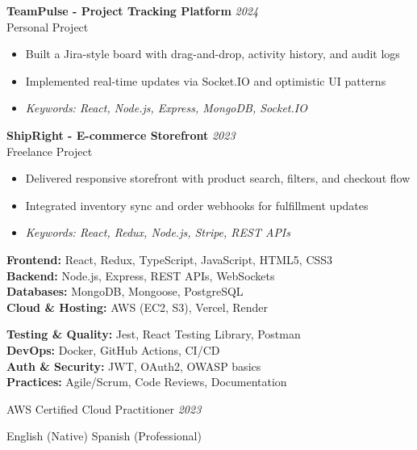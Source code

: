 \documentclass[11pt,a4paper]{article}
\begin{document}

\textbf{TeamPulse - Project Tracking Platform} \hfill \textit{2024}\\[-2pt]
Personal Project\\[-5pt]
\begin{itemize}[leftmargin=8pt,itemsep=1pt,topsep=2pt]
  \item Built a Jira-style board with drag-and-drop, activity history, and audit logs
  \item Implemented real-time updates via Socket.IO and optimistic UI patterns
  \item[] \textit{\footnotesize Keywords: React, Node.js, Express, MongoDB, Socket.IO}
\end{itemize}\vspace{3pt}

\textbf{ShipRight - E-commerce Storefront} \hfill \textit{2023}\\[-2pt]
Freelance Project\\[-5pt]
\begin{itemize}[leftmargin=8pt,itemsep=1pt,topsep=2pt]
  \item Delivered responsive storefront with product search, filters, and checkout flow
  \item Integrated inventory sync and order webhooks for fulfillment updates
  \item[] \textit{\footnotesize Keywords: React, Redux, Node.js, Stripe, REST APIs}
\end{itemize}\vspace{3pt}

{\small
\begin{minipage}[t]{0.48\textwidth}
  \textbf{Frontend:} React, Redux, TypeScript, JavaScript, HTML5, CSS3\\[1.5pt]
  \textbf{Backend:} Node.js, Express, REST APIs, WebSockets\\[1.5pt]
  \textbf{Databases:} MongoDB, Mongoose, PostgreSQL\\[1.5pt]
  \textbf{Cloud \& Hosting:} AWS (EC2, S3), Vercel, Render
\end{minipage}
\hfill
\begin{minipage}[t]{0.48\textwidth}
  \textbf{Testing \& Quality:} Jest, React Testing Library, Postman\\[1.5pt]
  \textbf{DevOps:} Docker, GitHub Actions, CI/CD\\[1.5pt]
  \textbf{Auth \& Security:} JWT, OAuth2, OWASP basics\\[1.5pt]
  \textbf{Practices:} Agile/Scrum, Code Reviews, Documentation
\end{minipage}
}

AWS Certified Cloud Practitioner \hfill \textit{2023}

English (Native) \textbar{} Spanish (Professional)

\end{document}
